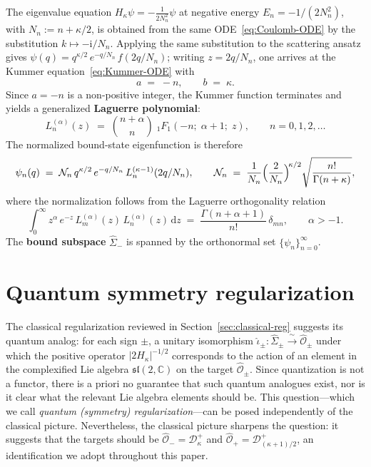 \documentclass[11pt]{article}
\theoremstyle{plain}
\theoremstyle{definition}
\theoremstyle{remark}
\newcommand{\C}{\mathbb{C}}
\newcommand{\Sigmah}{\widehat{\Sigma}}
\newcommand{\OOh}{\widehat{\mathcal{O}}}
\newcommand{\D}{\mathcal{D}}
\newcommand{\ii}{\mathrm{i}}
\begin{document}
The eigenvalue equation $H_{\kappa}\psi=-\frac{1}{2N_{n}^{2}}\psi$ at negative
energy $E_{n}=-1/(2N_{n}^{2})$, with $N_{n}:=n+\kappa/2$, is obtained from
the same ODE~\eqref{eq:Coulomb-ODE} by the substitution $k\mapsto -\ii/N_{n}$.
Applying the same substitution to the scattering ansatz gives
$\psi(q)=q^{\kappa/2}\,e^{-q/N_{n}}\,f(2q/N_{n})$; writing
$z=2q/N_{n}$, one arrives at the Kummer equation~\eqref{eq:Kummer-ODE}
with
\[
  a\;=\;-n,\qquad b\;=\;\kappa.
\]
Since $a=-n$ is a non-positive integer, the Kummer function terminates and
yields a generalized \textbf{Laguerre polynomial}:
\begin{equation}\label{eq:Laguerre-1F1}
  L_{n}^{(\alpha)}(z)\;=\;\binom{n+\alpha}{n}\;
    {}_{1}F_{1}(-n;\;\alpha+1;\;z),
  \qquad n=0,1,2,\dotsc
\end{equation}
The normalized bound-state eigenfunction is therefore
\begin{equation}\label{eq:psi-n-Laguerre}
  \psi_{n}(q)\;=\;\mathcal{N}_{n}\,q^{\kappa/2}\,e^{-q/N_{n}}\,
    L_{n}^{(\kappa-1)}(2q/N_{n}),\qquad
  \mathcal{N}_{n}\;=\;\frac{1}{N_{n}}\Bigl(\frac{2}{N_{n}}\Bigr)^{\!\kappa/2}
    \sqrt{\frac{n!}{\Gamma(n+\kappa)}},
\end{equation}
where the normalization follows from the Laguerre orthogonality relation~\cite[Ch.~18]{DLMF}
\begin{equation}\label{eq:Laguerre-orth}
  \int_{0}^{\infty}z^{\alpha}\,e^{-z}\,L_{m}^{(\alpha)}(z)\,L_{n}^{(\alpha)}(z)\,\mathrm{d}z
  \;=\;\frac{\Gamma(n+\alpha+1)}{n!}\,\delta_{mn},
  \qquad\alpha>-1.
\end{equation}
The \textbf{bound subspace} $\Sigmah_{-}$ is spanned by the orthonormal
set $\{\psi_{n}\}_{n=0}^{\infty}$.

\section{Quantum symmetry regularization}\label{sec:quantum-reg}

The classical regularization reviewed in Section~\ref{sec:classical-reg} suggests its quantum analog:
for each sign $\pm$, a unitary isomorphism
$\hat\iota_{\pm}\colon\Sigmah_{\pm}\xrightarrow{\;\sim\;}\OOh_{\pm}$
under which the positive operator $|2H_{\kappa}|^{-1/2}$ corresponds to
the action of an element in the complexified Lie algebra $\mathfrak{sl}(2,\C)$ on the target $\OOh_{\pm}$.
Since quantization is not a functor, there is a priori no guarantee that such quantum analogues exist, nor is it clear what the relevant Lie algebra elements should be.
This question---which we call \emph{quantum (symmetry) regularization}---can be posed independently of the classical picture.
Nevertheless, the classical picture sharpens the question: it suggests that the targets should be
$\OOh_{-}=\D^{+}_{\kappa}$ and $\OOh_{+}=\D^{+}_{(\kappa+1)/2}$, an identification we adopt throughout this paper.
\end{document}
